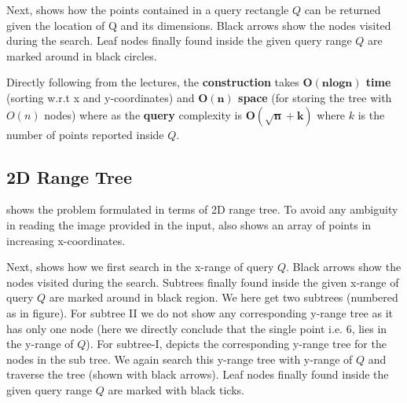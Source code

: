 Next,  shows how the points contained in a query rectangle $Q$ can be returned given the location of Q and its dimensions. Black arrows show the nodes visited during the search. Leaf nodes finally found inside the given query range $Q$ are marked around in black circles.

Directly following from the lectures, the \textbf{construction} takes \textbf{$\bm{O(nlogn)}$ time} (sorting w.r.t x and y-coordinates) and \textbf{$\bm{O(n)}$ space} (for storing the tree with $O(n)$ nodes) where as the \textbf{query} complexity is $\bm{O(\sqrt{n}+k)}$ where $k$ is the number of points reported inside $Q$.

\subsection{2D Range Tree}
 shows the problem formulated in terms of 2D range tree. To avoid any ambiguity in reading the image provided in the input,  also shows an array of points in increasing x-coordinates.


Next,  shows how we first search in the x-range of query $Q$. Black arrows show the nodes visited during the search. Subtrees finally found inside the given x-range of query $Q$ are marked around in black region. We here get two subtrees (numbered as in figure). For subtree II we do not show any corresponding y-range tree as it has only one node (here we directly conclude that the single point i.e. $6$, lies in the y-range of $Q$). For subtree-I,  depicts the corresponding y-range tree for the nodes in the sub tree. We again search this y-range tree with y-range of $Q$ and traverse the tree (shown with black arrows).  Leaf nodes finally found inside the given query range $Q$ are marked with black ticks.


